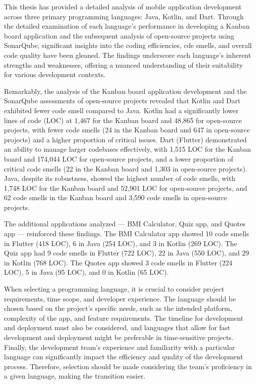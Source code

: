 
This thesis has provided a detailed analysis of mobile application development across three primary programming languages: Java, Kotlin, and Dart. Through the detailed examination of each language's performance in developing a Kanban board application and the subsequent analysis of open-source projects using SonarQube, significant insights into the coding efficiencies, cde smells, and overall code quality have been gleaned. The findings underscore each language's inherent strengths and weaknesses, offering a nuanced understanding of their suitability for various development contexts.
\par
Remarkably, the analysis of the Kanban board application development and the SonarQube assessments of open-source projects revealed that Kotlin and Dart exhibited fewer code smell compared to Java. Kotlin had a significantly lower lines of code (LOC) at 1,467 for the Kanban board and 48,865 for open-source projects, with fewer code smells (24 in the Kanban board and 647 in open-source projects) and a higher proportion of critical issues. Dart (Flutter) demonstrated an ability to manage larger codebases effectively, with 1,515 LOC for the Kanban board and 174,044 LOC for open-source projects, and a lower proportion of critical code smells (22 in the Kanban board and 1,303 in open-source projects). Java, despite its robustness, showed the highest number of code smells, with 1,748 LOC for the Kanban board and 52,901 LOC for open-source projects, and 62 code smells in the Kanban board and 3,590 code smells in open-source projects.
\par
The additional applications analyzed — BMI Calculator, Quiz app, and Quotes app — reinforced these findings. The BMI Calculator app showed 10 code smells in Flutter (418 LOC), 6 in Java (254 LOC), and 3 in Kotlin (269 LOC). The Quiz app had 9 code smells in Flutter (722 LOC), 22 in Java (550 LOC), and 29 in Kotlin (768 LOC). The Quotes app showed 3 code smells in Flutter (224 LOC), 5 in Java (95 LOC), and 0 in Kotlin (65 LOC).
\par
When selecting a programming language, it is crucial to consider project requirements, time scope, and developer experience. The language should be chosen based on the project's specific needs, such as the intended platform, complexity of the app, and feature requirements. The timeline for development and deployment must also be considered, and languages that allow for fast development and deployment might be preferable in time-sensitive projects. Finally, the development team's experience and familiarity with a particular language can significantly impact the efficiency and quality of the development process. Therefore, selection should be made considering the team's proficiency in a given language, making the transition easier.

